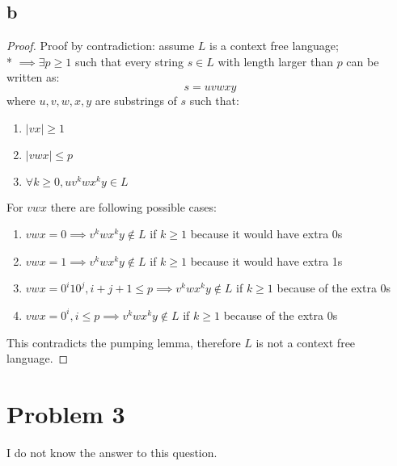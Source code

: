 \documentclass{article}
\begin{document}
\subsection*{b}
\begin{proof}
    Proof by contradiction: assume $L$ is a context free language;\\*
    $\implies \exists p \ge 1$ such that every string $s \in L$ with length larger than $p$ can be written as:
    $$s=uvwxy$$
    where $u,v,w,x,y$ are substrings of $s$ such that:
    \begin{enumerate}
        \item $|vx| \ge 1$
        \item $|vwx| \le p$
        \item $\forall k \ge 0, uv^kwx^ky \in L$
    \end{enumerate}
    For $vwx$ there are following possible cases:
    \begin{enumerate}
        \item $vwx=0 \implies v^kwx^ky \notin L$ if $k \ge 1$ because it would have extra 0s
        \item $vwx=1 \implies v^kwx^ky \notin L$ if $k \ge 1$ because it would have extra 1s
        \item $vwx=0^i10^j, i+j+1 \le p \implies v^kwx^ky \notin L$ if $k \ge 1$ because of the extra 0s
        \item $vwx=0^i, i \le p \implies v^kwx^ky \notin L$ if $k \ge 1$ because of the extra 0s
    \end{enumerate}
    This contradicts the pumping lemma, therefore $L$ is not a context free language.
\end{proof}

\section*{Problem 3}
I do not know the answer to this question.
\end{document}
